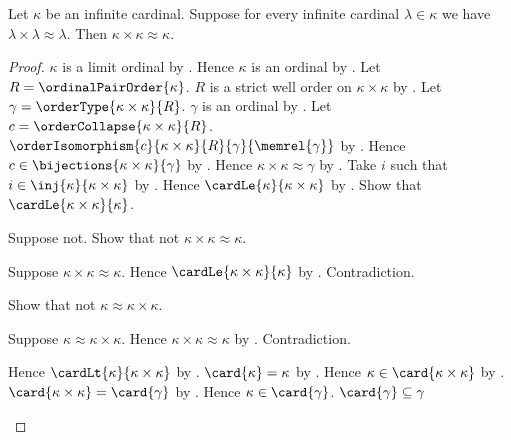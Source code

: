 \begin{lemma}\label{infinite_cardinal_square_step}
    Let $\kappa$ be an infinite cardinal.
    Suppose for every infinite cardinal $\lambda\in\kappa$ we have
        $\lambda\times\lambda\approx\lambda$.
    Then $\kappa\times\kappa\approx\kappa$.
\end{lemma}
\begin{proof}
    $\kappa$ is a limit ordinal
        by .
    Hence $\kappa$ is an ordinal by .
    Let $R=\ordinalPairOrder{\kappa}$.
    $R$ is a strict well order on $\kappa\times\kappa$
        by .
    Let $\gamma=\orderType{\kappa\times\kappa}{R}$.
    $\gamma$ is an ordinal by .
    Let $c=\orderCollapse{\kappa\times\kappa}{R}$.
    $\orderIsomorphism{c}{\kappa\times\kappa}{R}
        {\gamma}{\memrel{\gamma}}$
        by .
    Hence $c\in\bijections{\kappa\times\kappa}{\gamma}$
        by .
    Hence $\kappa\times\kappa\approx\gamma$ by .
    Take $i$ such that $i\in\inj{\kappa}{\kappa\times\kappa}$
        by .
    Hence $\cardLe{\kappa}{\kappa\times\kappa}$
        by .
    Show that $\cardLe{\kappa\times\kappa}{\kappa}$.
    \begin{subproof}
        Suppose not.
        Show that not $\kappa\times\kappa\approx\kappa$.
        \begin{subproof}
            Suppose $\kappa\times\kappa\approx\kappa$.
            Hence $\cardLe{\kappa\times\kappa}{\kappa}$
                by .
            Contradiction.
        \end{subproof}
        Show that not $\kappa\approx\kappa\times\kappa$.
        \begin{subproof}
            Suppose $\kappa\approx\kappa\times\kappa$.
            Hence $\kappa\times\kappa\approx\kappa$
                by .
            Contradiction.
        \end{subproof}
        Hence $\cardLt{\kappa}{\kappa\times\kappa}$
            by .
        $\card{\kappa}=\kappa$ by .
        Hence $\kappa\in\card{\kappa\times\kappa}$
            by .
        $\card{\kappa\times\kappa}=\card{\gamma}$
            by .
        Hence $\kappa\in\card{\gamma}$.
        $\card{\gamma}\subseteq\gamma$

\end{subproof}
\end{proof}
